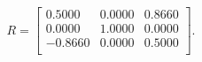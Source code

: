 \begin{equation*}
R = 
\begin{bmatrix}
  0.5000 &   0.0000 &   0.8660 \\
  0.0000 &   1.0000 &   0.0000 \\
 -0.8660 &   0.0000 &   0.5000 \\
\end{bmatrix}.
\end{equation*}

